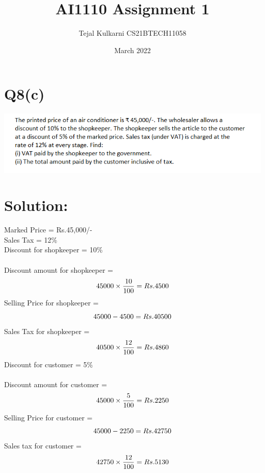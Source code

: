 \documentclass[12pt, letterpaper]{article}
\title{AI1110 Assignment 1}
\author{Tejal Kulkarni CS21BTECH11058}
\date{March 2022}
\begin{document}
\maketitle

\section*{Q8(c)}
    \includegraphics[scale=1.10]{question.png}
    \section*{Solution:}
Marked  Price = Rs.45,000/- \\
Sales  Tax = 12\% \\
Discount  for  shopkeeper = 10\% \\ \\
Discount  amount for shopkeeper =  \begin{equation*}
    45000\times\frac{10}{100} = Rs.4500\\ 
    \end{equation*} 
Selling Price for shopkeeper = \begin{equation*}
    45000 - 4500 = Rs.40500 \\
\end{equation*}
Sales Tax for shopkeeper = \begin{equation*} \\
    40500\times\frac{12}{100} =  Rs.4860\\
\end{equation*}
Discount for customer = 5\% \\ \\
Discount amount for customer  = 
\begin{equation*} 
     45000\times\frac{5}{100} = Rs.2250 \\ 
    \end{equation*}
Selling Price for customer = \begin{equation*}\\
    45000 - 2250 =  Rs.42750\\
\end{equation*}
Sales tax for customer = \begin{equation*}\\
    42750\times\frac{12}{100} = Rs.5130\\
\end{equation*} \\
\end{document}
